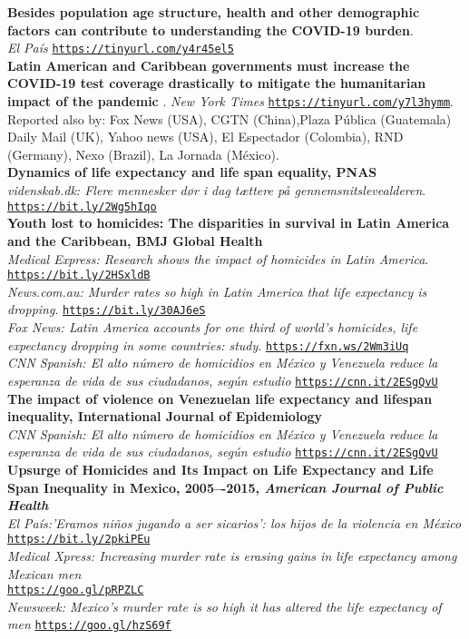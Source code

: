 \documentclass[12pt]{article}
\providecommand*\url[1]{\href{#1}{#1}}
\renewcommand*\url[1]{\href{#1}{\texttt{#1}}}
\begin{document}
\textbf{Besides population age structure, health and other demographic factors can contribute to understanding the COVID-19 burden}.\\
\textit{El Pa\'is} \url{https://tinyurl.com/y4r45el5}\\

\textbf{Latin American and Caribbean governments must increase the COVID-19 test coverage drastically to mitigate the humanitarian impact of the pandemic
}. 
\textit{New York Times} \url{https://tinyurl.com/y7l3hymm}.\\
Reported also by: Fox News (USA), CGTN (China),Plaza Pública (Guatemala)  Daily Mail (UK), Yahoo news (USA), El Espectador (Colombia), RND (Germany), Nexo (Brazil), La Jornada (M\'exico).\\


\textbf{Dynamics of life expectancy and life span equality, PNAS
}\\
\emph{videnskab.dk: Flere mennesker dør i dag tættere på gennemsnitslevealderen}.\\
 \url{https://bit.ly/2Wg5hIqo}\\

\textbf{Youth lost to homicides: The disparities in survival in Latin America and the Caribbean, BMJ Global Health
}\\
\emph{Medical Express: Research shows the impact of homicides in Latin America}. \url{https://bit.ly/2HSxldB}\\
\emph{News.com.au: Murder rates so high in Latin America that life expectancy is dropping}. \url{https://bit.ly/30AJ6eS}\\
\emph{Fox News: Latin America accounts for one third of world's homicides, life expectancy dropping in some countries: study}. \url{https://fxn.ws/2Wm3iUq}\\
\emph{CNN Spanish: El alto n\'umero de homicidios en M\'exico y Venezuela reduce la esperanza de vida de sus ciudadanos, seg\'un estudio} \url{https://cnn.it/2ESgQvU}\\

\textbf{The impact of violence on Venezuelan life expectancy and lifespan inequality, International Journal of Epidemiology
}\\ 
\emph{CNN Spanish: El alto n\'umero de homicidios en M\'exico y Venezuela reduce la esperanza de vida de sus ciudadanos, seg\'un estudio} \url{https://cnn.it/2ESgQvU}\\



\textbf{Upsurge of Homicides and Its Impact on Life Expectancy and Life Span Inequality in Mexico, 2005–-2015, \emph{American Journal of Public Health}}\\
\emph{El Pa\'is:'Eramos ni\~nos jugando a ser sicarios': los hijos de la violencia en M\'exico }\\
\url{https://bit.ly/2pkiPEu}\\
\emph{ Medical Xpress: Increasing murder rate is erasing gains in life expectancy among Mexican men}\\ \url{https://goo.gl/pRPZLC}\\
\emph{ Newsweek: Mexico's murder rate is so high it has altered the life expectancy of men} \url{https://goo.gl/hzS69f}\\
\end{document}
